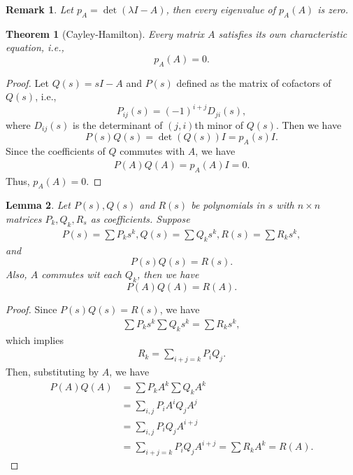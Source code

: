 \documentclass[11pt]{book}
\newtheorem{theorem}{Theorem}[chapter]
\newtheorem{lemma}[theorem]{Lemma}
\newtheorem{remark}{Remark}[chapter]
\theoremstyle{definition}
\numberwithin{equation}{chapter}
\begin{document}
\begin{remark}
Let $p_A = \det(\lambda I - A)$, then every eigenvalue of $p_A(A)$ is zero.
\end{remark}

\medskip

\begin{theorem}[Cayley-Hamilton]
Every matrix $A$ satisfies its own characteristic equation, i.e.,
$$p_A(A) = 0.$$
\end{theorem}
\begin{proof}
Let $Q(s) = sI - A$ and $P(s)$ defined as the matrix of cofactors of $Q(s)$, i.e., 
$$P_{ij}(s) = (-1)^{i+j}D_{ji}(s),$$
where $D_{ij}(s)$ is the determinant of $(j,i)$th minor of $Q(s)$. Then we have 
$$P(s)Q(s) = \det (Q(s)) I = p_A(s)I.$$
Since the coefficients of $Q$ commutes with $A$, we have 
\begin{align*}
    P(A)Q(A) = p_A(A)I = 0.
\end{align*}
Thus, $p_A(A) = 0$.
\end{proof}

\medskip

\begin{lemma}
Let $P(s), Q(s)$ and $R(s)$ be polynomials in $s$ with $n\times n$ matrices $P_k, Q_k, R_s$ as coefficients. Suppose
\begin{align*}
    P(s) = \sum P_k s^k, Q(s) = \sum Q_k s^k, R(s) = \sum R_k s^k,
\end{align*}
and 
$$P(s)Q(s) = R(s).$$
Also, $A$ commutes wit each $Q_k$, then we have 
$$P(A)Q(A) = R(A).$$
\end{lemma}
\begin{proof}
Since $P(s)Q(s) = R(s)$, we have
\begin{align*}
    \sum P_k s^k \sum Q_k s^k = \sum R_k s^k,
\end{align*}
which implies 
\begin{align*}
    R_k = \sum_{i+j=k} P_i Q_j.
\end{align*}
Then, substituting by $A$, we have
\begin{align*}
    P(A)Q(A) & = \sum P_k A^k \sum Q_k A^k \\
    & = \sum_{i,j} P_i A^i Q_j A^j \\
    & = \sum_{i,j} P_i Q_j A^{i+j} \\
    & = \sum_{i+j=k} P_i Q_j A^{i+j} = \sum R_k A^k = R(A).
\end{align*}
\end{proof}

\medskip
\end{document}
